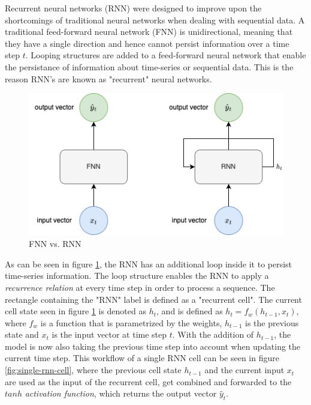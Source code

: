         Recurrent neural networks (RNN) were designed to improve upon the shortcomings of traditional neural networks when dealing with sequential data.
        A traditional feed-forward neural network (FNN) is unidirectional, meaning that they have a single direction and hence cannot persist information over a time step $t$.
        Looping structures are added to a feed-forward neural network that enable the persistance of information about time-series or sequential data. 
        This is the reason RNN's are known as "recurrent" neural networks.
        \begin{figure}[h!]
            \centering
            \includegraphics[scale=0.5]{figures/FNN_vs_RNN.drawio.png}
            \caption{FNN vs. RNN}
            \label{fig:fnn-vs-rnn}
        \end{figure}
        As can be seen in figure \ref{fig:fnn-vs-rnn}, the RNN has an additional loop inside it to persist time-series information. The loop structure enables the RNN to apply a \emph{recurrence relation} at every time step in order to process a sequence.
        The rectangle containing the "RNN" label is defined as a "recurrent cell".
        The current cell state seen in figure \ref{fig:fnn-vs-rnn} is denoted as $h_t$, and is defined as $h_t = f_w(h_{t - 1}, x_t)$, where $f_w$ is a function that is parametrized by the weights, $h_{t-1}$ is the previous state and $x_t$ is the input vector at time step $t$. With the addition of $h_{t-1}$, the model is now also taking the previous time step into account when updating the current time step.
        This workflow of a single RNN cell can be seen in figure \ref{fig:single-rnn-cell}, where the previous cell state $h_{t-1}$ and the current input $x_t$ are used as the input of the recurrent cell, get combined and forwarded to the $tanh$ \emph{activation function}, which returns the output vector $\hat{y}_t$.

